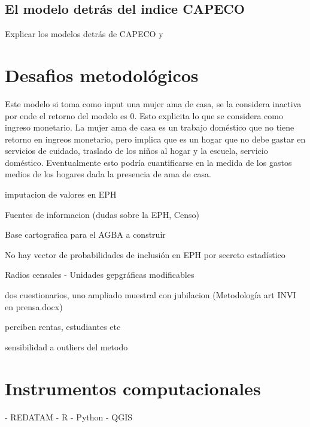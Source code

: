 \subsection{El modelo detrás del indice CAPECO} \label{cap2-modeloCapeco}

Explicar los modelos detrás de CAPECO y 




	\section{Desafios metodológicos}


Este modelo si toma como input una mujer ama de casa, se la considera inactiva por ende el retorno del modelo es 0. Esto explicita lo que se considera como ingreso monetario. La mujer ama de casa es un trabajo doméstico que no tiene retorno en ingreos monetario, pero implica que es un hogar que no debe gastar en servicios de cuidado, traslado de los niños al hogar y la escuela, servicio doméstico. Eventualmente esto podría cuantificarse en la medida de los gastos medios de los hogares dada la presencia de ama de casa.

imputacion de valores en EPH

Fuentes de informacion (dudas sobre la EPH, Censo)

Base cartografica para el AGBA a construir

No hay vector de probabilidades de inclusión en EPH por secreto estadístico

Radios censales - Unidades gepgráficas modificables

dos cuestionarios, uno ampliado muestral con jubilacion (Metodología art INVI en prensa.docx)

perciben rentas, estudiantes etc

sensibilidad a outliers del metodo
	
	\section{Instrumentos computacionales}
	- REDATAM
	- R
	- Python
	- QGIS